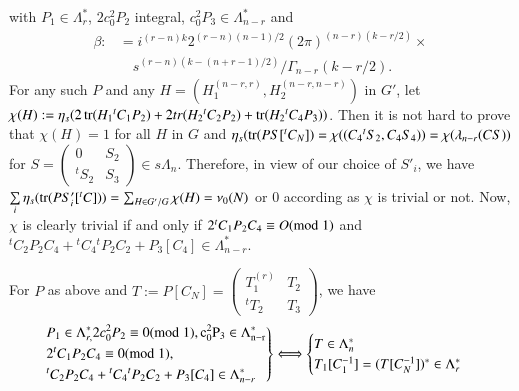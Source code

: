 with $P_{1}\in\Lambda^{\ast}_{r}$, $2c^{2}_{0}P_{2}$ integral,
$c^{2}_{0}P_{3}\in\Lambda^{\ast}_{n-r}$ and
\begin{align*}
\beta: &= i^{(r-n)k}2^{(r-n)(n-1)/2}(2\pi)^{(n-r)(k-r/2)}\times\\
&\quad s^{(r-n)(k-(n+r-1)/2)}/\Gamma_{n-r}(k-r/2).
\end{align*}
For any such $P$ and any $H=(H_{1}^{(n-r,r)}, H_{2}^{(n-r,n-r)})$ in
$G'$, let $\chi(H):=\eta_{s}(2\operatorname{tr}(H_{1}{}^{t}C_{1}P_{2})+2tr(H_{2}
{}^{t}C_{2}P_{2})+\operatorname{tr}(H_{2}{}^{t}C_{4}P_{3}))$. Then 
it is not hard to prove that $\chi(H)=1$ for all $H$ in $G$ and 
$\eta_{s}(\tr(PS[{}^{t}C_{N}]) =
\chi((C_{4}{}^{t}S_{2},\break C_{4}S_{4}))=\chi(\lambda_{n-r}(CS))$ 
for $S=\left(\begin{smallmatrix} 0 & S_{2}\\ {}^{t}S_{2} & S_{3}
\end{smallmatrix}\right)\in s\Lambda_{n}$. Therefore, in view of our
choice of $S'_{i}$, we have
$\sum\limits_{i}\eta_{s}(\operatorname{tr}(PS'_{i}[{}^{t}C]))=\sum_{H\in
  G'/G}\chi(H)=\nu_{0}(N)$ or $0$ according as $\chi$ is trivial or
not. Now, $\chi$ is clearly trivial if and only if
$2{}^{t}C_{1}P_{2}C_{4}\equiv O(\rm{mod} \; 1)$ and
${}^{t}C_{2}P_{2}C_{4}+{}^{t}C_{4}{}^{t}P_{2}C_{2}+P_{3}[C_{4}]\in\Lambda^{\ast}_{n-r}$. 

\begin{sublemma}\label{c1:lem-1.6.21}
For $P$ as above and $T:=P[C_{N}]=\left(\begin{smallmatrix}
  T^{(r)}_{1} & T_{2}\\ {}^{t}T_{2} & T_{3}
\end{smallmatrix}\right)$, we have
{\fontsize{10}{12}\selectfont
\begin{equation*}
\left.
\begin{split}
& P_{1}\in\Lambda^{\ast}_{r,}2c^{2}_{0}P_{2}\equiv 0(\rm{mod} \; 1),
c^{2}_{0}P_{3}\in\Lambda^{\ast}_{n-r}\\
& 2{}^{t}C_{1}P_{2}C_{4}\equiv 0(\rm{mod} \; 1),\\
&{}^{t}C_{2}P_{2}C_{4}+{}^{t}C_{4}{}^{t}P_{2}C_{2}+P_{3}[C_{4}]\in\Lambda^{\ast}_{n-r}
\end{split}
\right\}
\Longleftrightarrow
\begin{cases}
T\in \Lambda^{\ast}_{n}\\
T_{1}[C^{-1}_{1}]=(T[C^{-1}_{N}])^{\ast}\in\Lambda^{\ast}_{r}
\end{cases}
\end{equation*}}
\end{sublemma}


